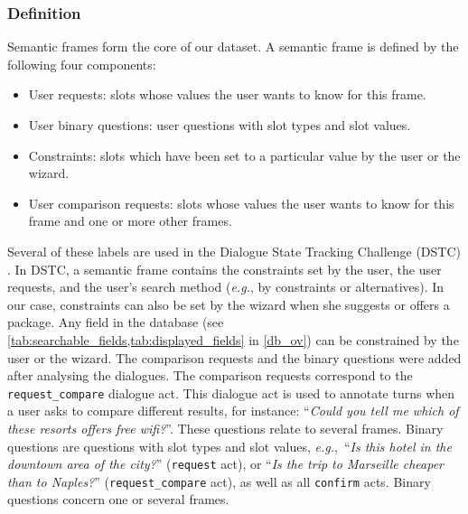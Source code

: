 \documentclass{article}
\theoremstyle{definition}
\begin{document}
\subsubsection{Definition}
\label{frameDef}
Semantic frames form the core of our dataset. A semantic frame is defined by the following four components:
\begin{itemize}[noitemsep]
\item User requests: slots whose values the user wants to know for this frame.
\item User binary questions: user questions with slot types and slot values.
\item Constraints: slots which have been set to a particular value by the user or the wizard.
\item User comparison requests: slots whose values the user wants to know for this frame and one or more other frames.
\end{itemize}
Several of these labels are used in the Dialogue State Tracking Challenge (DSTC) \citep{Williams:16b}. In DSTC, a semantic frame contains the constraints set by the user, the user requests, and the user's search method (\textit{e.g.}, by constraints or alternatives). In our case, constraints can also be set by the wizard when she suggests or offers a package. Any field in the database (see \cref{tab:searchable_fields,tab:displayed_fields} in \cref{db_ov}) can be constrained by the user or the wizard. The comparison requests and the binary questions were added after analysing the dialogues. The comparison requests correspond to the \texttt{request\_compare} dialogue act. This dialogue act is used to annotate turns when a user asks to compare different results, for instance: ``\textit{Could you tell me which of these resorts offers free wifi?}''. These questions relate to several frames. Binary questions are questions with slot types and slot values, \textit{e.g.},~``\textit{Is this hotel in the downtown area of the city?}'' (\texttt{request} act), or ``\textit{Is the trip to Marseille cheaper than to Naples?}'' (\texttt{request\_compare} act), as well as all \texttt{confirm} acts. Binary questions concern one or several frames.
\end{document}
